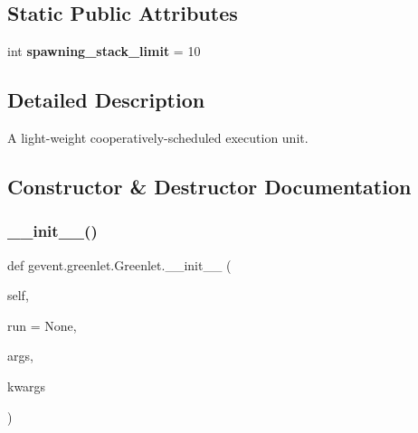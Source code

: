 \subsection*{Static Public Attributes}
\begin{DoxyCompactItemize}
\item 
\mbox{\label{classgevent_1_1greenlet_1_1_greenlet_acd0a005720a5e267145a2b3a27409f75}} 
int {\bfseries spawning\+\_\+stack\+\_\+limit} = 10
\end{DoxyCompactItemize}


\subsection{Detailed Description}
\begin{DoxyVerb}A light-weight cooperatively-scheduled execution unit.
\end{DoxyVerb}
 

\subsection{Constructor \& Destructor Documentation}
\mbox{\label{classgevent_1_1greenlet_1_1_greenlet_a5cd9e6984f6334243ac371786654c1e6}} 
\subsubsection{\texorpdfstring{\+\_\+\+\_\+init\+\_\+\+\_\+()}{\_\_init\_\_()}}
{\footnotesize\ttfamily def gevent.\+greenlet.\+Greenlet.\+\_\+\+\_\+init\+\_\+\+\_\+ (\begin{DoxyParamCaption}\item[{}]{self,  }\item[{}]{run = {\ttfamily None},  }\item[{}]{args,  }\item[{}]{kwargs }\end{DoxyParamCaption})}

